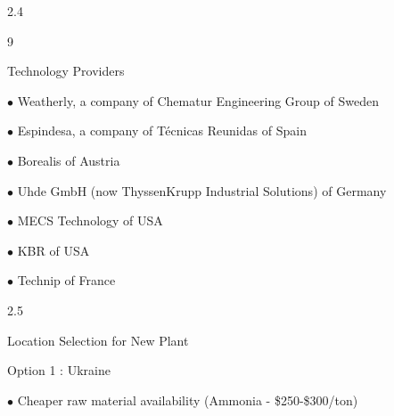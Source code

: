 \documentclass[a4paper,portrait,12pt]{article}
\begin{document}
2.4





9





\begin{flushleft}
Technology Providers
\end{flushleft}





\begin{flushleft}
$\bullet$ Weatherly, a company of Chematur Engineering Group of Sweden
\end{flushleft}


\begin{flushleft}
$\bullet$ Espindesa, a company of Técnicas Reunidas of Spain
\end{flushleft}


\begin{flushleft}
$\bullet$ Borealis of Austria
\end{flushleft}


\begin{flushleft}
$\bullet$ Uhde GmbH (now ThyssenKrupp Industrial Solutions) of Germany
\end{flushleft}


\begin{flushleft}
$\bullet$ MECS Technology of USA
\end{flushleft}


\begin{flushleft}
$\bullet$ KBR of USA
\end{flushleft}


\begin{flushleft}
$\bullet$ Technip of France
\end{flushleft}





2.5





\begin{flushleft}
Location Selection for New Plant
\end{flushleft}





\begin{flushleft}
Option 1 : Ukraine
\end{flushleft}


\begin{flushleft}
$\bullet$ Cheaper raw material availability (Ammonia - \$250-\$300/ton)
\end{flushleft}
\end{document}
